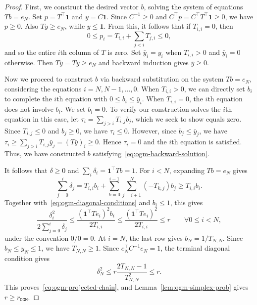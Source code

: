 \documentclass[11pt]{article}
\begin{document}
\begin{proof}
First, we construct the desired vector $b$, solving the system of equations $Tb=e_N$.
Set $p=T^\top\mathbf1$ and $y=C\mathbf1$.
Since $C^{-1}\geq0$ and
$C^\top p=C^\top T^\top\mathbf1\geq0$, we have $p\geq0$.
Also $Ty\geq e_N$, while $y\leq\mathbf1$.
From this, it follows that if $T_{i,i}=0$, then
\[
    0\leq p_i=T_{i,i}+\sum_{j<i}T_{j,i}\leq0,
\]
and so the entire $i$th column of $T$ is zero. Set $\bar y_i=y_i$ when
$T_{i,i}>0$ and $\bar y_i=0$ otherwise. Then
$T\bar y=Ty\geq e_N$ and backward induction gives $\bar y\geq0$.


Now we proceed to construct $b$ via backward substitution on the system $Tb=e_N$, considering the equations $i=N,N-1,\dots,0$. When $T_{i,i}>0$, we can directly set $b_i$ to complete the $i$th equation with $0\leq b_i\leq\bar y_i$.
When $T_{i,i}=0$, the $i$th equation does not involve $b_i$. We set $b_i=0$. To verify our construction solves the $i$th equation in this case, let $\tau_i = \sum_{j>i} T_{i,j}b_j$, which we seek to show equals zero. Since $T_{i,j}\leq 0$ and $b_j\geq 0$, we have $\tau_i\leq 0$. However, since $b_j \leq \bar{y}_j$, we have $\tau_i \geq \sum_{j>i} T_{i,j}\bar{y}_j = (T\bar{y})_i \geq 0$. Hence $\tau_i=0$ and the $i$th equation is satisfied. Thus, we have constructed $b$ satisfying~\eqref{eq:ogm-backward-solution}.

It follows that $\delta\geq0$ and
$\sum_i\delta_i=\mathbf1^\top Tb=1$. For $i<N$, expanding $Tb=e_N$
gives
\begin{equation}\label{eq:ogm-cut-r}
    \sum_{j=0}^i\delta_j
    =T_{i,i}b_i
    +\sum_{k=0}^{i-1}\sum_{j=i+1}^N(-T_{k,j})b_j
    \geq T_{i,i}b_i.
\end{equation}
Together with~\eqref{eq:ogm-diagonal-conditions} and $b_i\leq1$, this
gives
\[
    \frac{\delta_i^2}{2\sum_{j=0}^i\delta_j}
    \leq
    \frac{(\mathbf1^\top Te_i)^2b_i}{2T_{i,i}}
    \leq
    \frac{(\mathbf1^\top Te_i)^2}{2T_{i,i}}
    \leq r
    \qquad \forall 0\leq i<N,
\]
under the convention $0/0=0$. At $i=N$, the last row gives
$b_N=1/T_{N,N}$. Since $b_N\leq y_N\leq1$, we have $T_{N,N}\geq1$.
Since $e_N^\top C^{-1}e_N=1$, the terminal diagonal condition gives
\[
    \delta_N^2
    \leq r\frac{2T_{N,N}-1}{T_{N,N}^2}
    \leq r.
\]
This proves~\eqref{eq:ogm-projected-chain}, and
Lemma~\ref{lem:ogm-simplex-prob} gives
$r\geq r_\mathtt{OGM}$.


\end{proof}
\end{document}
